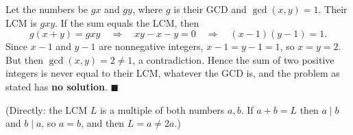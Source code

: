 Let the numbers be $gx$ and $gy$, where $g$ is their GCD and $\gcd(x,y)=1$. Their LCM is $gxy$. If the sum equals the LCM, then
\[
g(x+y)=gxy\quad\Longrightarrow\quad xy-x-y=0\quad\Longrightarrow\quad (x-1)(y-1)=1 .
\]
Since $x-1$ and $y-1$ are nonnegative integers, $x-1=y-1=1$, so $x=y=2$. But then $\gcd(x,y)=2\ne1$, a contradiction. Hence the sum of two positive integers is never equal to their LCM, whatever the GCD is, and the problem as stated has \textbf{no solution}. $\blacksquare$

(Directly: the LCM $L$ is a multiple of both numbers $a,b$. If $a+b=L$ then $a\mid b$ and $b\mid a$, so $a=b$, and then $L=a\ne2a$.)
